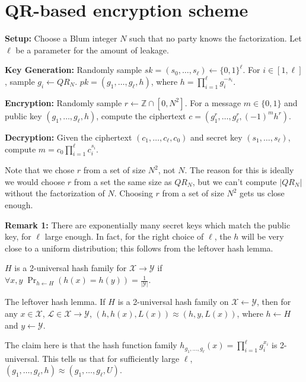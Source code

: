\documentclass[10pt]{article}
\begin{document}
\section{QR-based encryption scheme}


\textbf{Setup:} Choose a Blum integer $N$ such that no party knows the factorization. Let $\ell$ be a parameter for the amount of leakage.

\textbf{Key Generation:} Randomly sample  $sk = (s_0,\dots,s_\ell) \leftarrow \{0,1\}^\ell$. For $i \in [1,\ell]$, sample $g_i \leftarrow QR_N$. $pk = (g_1,\dots,g_\ell,h)$, where $h = \prod_{i=1}^\ell g_i^{-s_i}$.

\textbf{Encryption:} Randomly sample $r \leftarrow \mathbb{Z} \cap [0,N^2]$. For a message $m \in \{0,1\}$ and public key $(g_1,\dots,g_\ell,h)$, compute the ciphertext $c = (g_1^r,\dots,g_\ell^r,(-1)^m h^r)$. 

\textbf{Decryption:} Given the ciphertext $(c_1,\dots,c_\ell,c_0)$ and secret key $(s_1,\dots,s_\ell)$, compute $m = c_0 \prod_{i=1}^\ell c_i^{s_i}$.

Note that we chose $r$ from a set of size $N^2$, not $N$. The reason for this is ideally we would choose $r$ from a set the same size as $QR_N$, but we can't compute $|QR_N|$ without the factorization of $N$. Choosing $r$ from a set of size $N^2$ gets us close enough.

\textbf{Remark 1:} There are exponentially many secret keys which match the public key, for $\ell$ large enough. In fact, for the right choice of $\ell$, the $h$ will be very close to a uniform distribution; this follows from the leftover hash lemma. 

\begin{definition}
$H$ is a 2-universal hash family for $\mathcal{X} \rightarrow \mathcal{Y}$ if $\forall x,y \; \Pr_{h \leftarrow H}(h(x) = h(y)) = \frac{1}{|\mathcal{Y}|}$.
\end{definition}

\begin{lemma}
The leftover hash lemma. If $H$ is a 2-universal hash family on $\mathcal{X} \leftarrow \mathcal{Y}$, then for any $x \in \mathcal{X}$, $\mathcal{L} \in \mathcal{X} \rightarrow \mathcal{Y}$, $(h,h(x),L(x)) \approx (h,y,L(x))$, where $h \leftarrow H$ and $y \leftarrow \mathcal{Y}$.
\end{lemma}

The claim here is that the hash function family $h_{g_1,\dots,g_\ell}(x) = \prod_{i=1}^\ell g_i ^ {x_i}$ is 2-universal. This tells us that for sufficiently large $\ell$, $(g_1,\dots,g_\ell,h) \approx (g_1,\dots,g_\ell,U)$.
\end{document}
